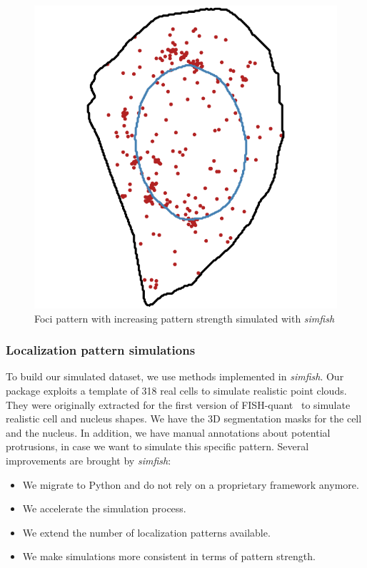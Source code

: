 \begin{figure}[h]
	\endminipage\hfill
		\includegraphics[width=\linewidth]{figures/chapter4/simulation_foci_90}
	\endminipage
	\caption{Foci pattern with increasing pattern strength simulated with \emph{simfish}}
	\label{fig:foci_panel}
\end{figure}

\subsubsection{Localization pattern simulations}

To build our simulated dataset, we use methods implemented in \emph{simfish}.
Our package exploits a template of 318 real cells to simulate realistic point clouds.
They were originally extracted for the first version of FISH-quant~\cite{samacoits_computational_2018} to simulate realistic cell and nucleus shapes.
We have the 3D segmentation masks for the cell and the nucleus.
In addition, we have manual annotations about potential protrusions, in case we want to simulate this specific pattern.
Several improvements are brought by \emph{simfish}:
\begin{itemize}
	\item We migrate to Python and do not rely on a proprietary framework anymore.
	\item We accelerate the simulation process.
	\item We extend the number of localization patterns available.
	\item We make simulations more consistent in terms of pattern strength.
\end{itemize}

